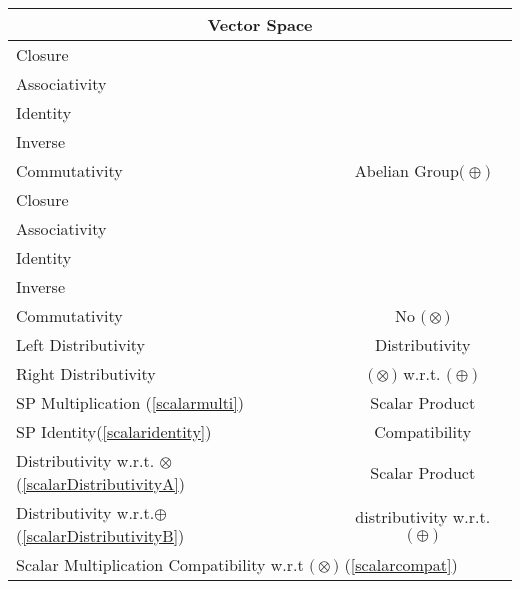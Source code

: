 \documentclass[a4paper,12pt]{scrartcl}
\newcommand{\OpA}{\otimes}
\newcommand{\OpB}{\oplus}
\begin{document}
\begin{minipage}[c]{0,5\textwidth}

\begin{tabular}{|l|c|} %
  \hline
  \multicolumn{2}{c}{\cellcolor{green!25}Vector Space} \\
  \hline
    \cellcolor{blue!25} \footnotesize Closure& \cellcolor{yellow!25}  \\
    \cellcolor{blue!25} \footnotesize Associativity& \cellcolor{yellow!25}  \\
    \cellcolor{blue!25} \footnotesize Identity& \cellcolor{yellow!25} \\
    \cellcolor{blue!25} \footnotesize Inverse& \cellcolor{yellow!25} \\
    \cellcolor{blue!25} \footnotesize Commutativity& \multirow{-5}{*}{\tiny\cellcolor{yellow!25}Abelian Group$\big(\OpB\big)$} \\
   \hline
    \cellcolor{red!25} \footnotesize Closure& \cellcolor{red!25}  \\
    \cellcolor{red!25} \footnotesize Associativity& \cellcolor{red!25}  \\
    \cellcolor{red!25} \footnotesize Identity& \cellcolor{red!25} \\
    \cellcolor{red!25} \footnotesize Inverse& \cellcolor{red!25} \\
    \cellcolor{red!25} \footnotesize Commutativity& \multirow{-5}{*}{\tiny\cellcolor{red!25} No $\big(\OpA\big)$} \\
  \hline
  	\cellcolor{red!25} \footnotesize Left Distributivity&  \tiny\cellcolor{red!25}Distributivity\\
    \cellcolor{red!25} \footnotesize Right Distributivity & \tiny\cellcolor{red!25} $\big(\OpA\big)$ w.r.t. $\big(\OpB\big)$  \\
   \hline
  \hline
     \cellcolor{blue!25} \footnotesize SP Multiplication (\ref{scalarmulti})&  \tiny\cellcolor{yellow!25}Scalar Product\\
    \cellcolor{blue!25} \footnotesize SP Identity(\ref{scalaridentity}) & \tiny\cellcolor{yellow!25} Compatibility  \\
   \hline 
    \cellcolor{blue!25} \footnotesize Distributivity w.r.t. $\OpA$ (\ref{scalarDistributivityA})&  \tiny\cellcolor{yellow!25}Scalar Product\\
    \cellcolor{blue!25} \footnotesize Distributivity w.r.t.$\OpB$ (\ref{scalarDistributivityB}) & \tiny\cellcolor{yellow!25} distributivity w.r.t. $\big(\OpB\big)$  \\
   \hline
    \multicolumn{2}{l}{\footnotesize \cellcolor{red!25} Scalar Multiplication Compatibility w.r.t  $\big(\OpA\big)$ (\ref{scalarcompat})}\\
   \hline
\end{tabular}


\end{minipage}
\end{document}
